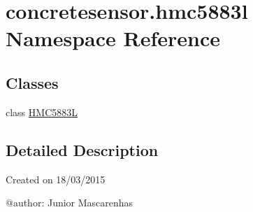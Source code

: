 \hypertarget{namespaceconcretesensor_1_1hmc5883l}{}\section{concretesensor.\+hmc5883l Namespace Reference}
\label{namespaceconcretesensor_1_1hmc5883l}
\subsection*{Classes}
\begin{DoxyCompactItemize}
\item 
class \hyperlink{classconcretesensor_1_1hmc5883l_1_1HMC5883L}{H\+M\+C5883\+L}
\end{DoxyCompactItemize}


\subsection{Detailed Description}
\begin{DoxyVerb}Created on 18/03/2015

@author: Junior Mascarenhas
\end{DoxyVerb}
 